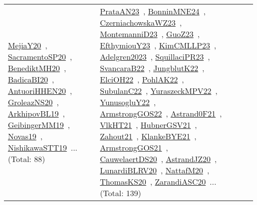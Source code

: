 {\begin{longtable}{lp{3cm}>{\raggedright\arraybackslash}p{6cm}>{\raggedright\arraybackslash}p{6cm}>{\raggedright\arraybackslash}p{8cm}}
\href{../works/MejiaY20.pdf}{MejiaY20}~\cite{MejiaY20}, \href{../works/SacramentoSP20.pdf}{SacramentoSP20}~\cite{SacramentoSP20}, \href{../works/BenediktMH20.pdf}{BenediktMH20}~\cite{BenediktMH20}, \href{../works/BadicaBI20.pdf}{BadicaBI20}~\cite{BadicaBI20}, \href{../works/AntuoriHHEN20.pdf}{AntuoriHHEN20}~\cite{AntuoriHHEN20}, \href{../works/GroleazNS20.pdf}{GroleazNS20}~\cite{GroleazNS20}, \href{../works/ArkhipovBL19.pdf}{ArkhipovBL19}~\cite{ArkhipovBL19}, \href{../works/GeibingerMM19.pdf}{GeibingerMM19}~\cite{GeibingerMM19}, \href{../works/Novas19.pdf}{Novas19}~\cite{Novas19}, \href{../works/NishikawaSTT19.pdf}{NishikawaSTT19}~\cite{NishikawaSTT19}... (Total: 88) & \href{../works/PrataAN23.pdf}{PrataAN23}~\cite{PrataAN23}, \href{../works/BonninMNE24.pdf}{BonninMNE24}~\cite{BonninMNE24}, \href{../works/CzerniachowskaWZ23.pdf}{CzerniachowskaWZ23}~\cite{CzerniachowskaWZ23}, \href{../works/MontemanniD23.pdf}{MontemanniD23}~\cite{MontemanniD23}, \href{../works/GuoZ23.pdf}{GuoZ23}~\cite{GuoZ23}, \href{../works/EfthymiouY23.pdf}{EfthymiouY23}~\cite{EfthymiouY23}, \href{../works/KimCMLLP23.pdf}{KimCMLLP23}~\cite{KimCMLLP23}, \href{../works/Adelgren2023.pdf}{Adelgren2023}~\cite{Adelgren2023}, \href{../works/SquillaciPR23.pdf}{SquillaciPR23}~\cite{SquillaciPR23}, \href{../works/SvancaraB22.pdf}{SvancaraB22}~\cite{SvancaraB22}, \href{../works/JungblutK22.pdf}{JungblutK22}~\cite{JungblutK22}, \href{../works/ElciOH22.pdf}{ElciOH22}~\cite{ElciOH22}, \href{../works/PohlAK22.pdf}{PohlAK22}~\cite{PohlAK22}, \href{../works/SubulanC22.pdf}{SubulanC22}~\cite{SubulanC22}, \href{../works/YuraszeckMPV22.pdf}{YuraszeckMPV22}~\cite{YuraszeckMPV22}, \href{../works/YunusogluY22.pdf}{YunusogluY22}~\cite{YunusogluY22}, \href{../works/ArmstrongGOS22.pdf}{ArmstrongGOS22}~\cite{ArmstrongGOS22}, \href{../works/Astrand0F21.pdf}{Astrand0F21}~\cite{Astrand0F21}, \href{../works/VlkHT21.pdf}{VlkHT21}~\cite{VlkHT21}, \href{../works/HubnerGSV21.pdf}{HubnerGSV21}~\cite{HubnerGSV21}, \href{../works/Zahout21.pdf}{Zahout21}~\cite{Zahout21}, \href{../works/KlankeBYE21.pdf}{KlankeBYE21}~\cite{KlankeBYE21}, \href{../works/ArmstrongGOS21.pdf}{ArmstrongGOS21}~\cite{ArmstrongGOS21}, \href{../works/CauwelaertDS20.pdf}{CauwelaertDS20}~\cite{CauwelaertDS20}, \href{../works/AstrandJZ20.pdf}{AstrandJZ20}~\cite{AstrandJZ20}, \href{../works/LunardiBLRV20.pdf}{LunardiBLRV20}~\cite{LunardiBLRV20}, \href{../works/NattafM20.pdf}{NattafM20}~\cite{NattafM20}, \href{../works/ThomasKS20.pdf}{ThomasKS20}~\cite{ThomasKS20}, \href{../works/ZarandiASC20.pdf}{ZarandiASC20}~\cite{ZarandiASC20}... (Total: 139)\\

\end{longtable}}
